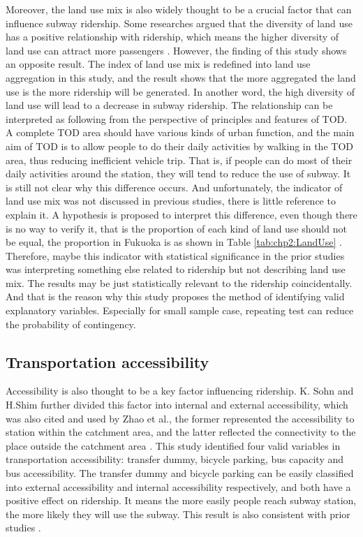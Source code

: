 %
Moreover, the land use mix is also widely thought to be a crucial factor that can influence subway ridership. Some researches argued that the diversity of land use has a positive relationship with ridership, which means the higher diversity of land use can attract more passengers \cite{gutierrez2011transit,jun2015land}. However, the finding of this study shows an opposite result. The index of land use mix is redefined into land use aggregation in this study, and the result shows that the more aggregated the land use is the more ridership will be generated. In another word, the high diversity of land use will lead to a decrease in subway ridership. The relationship can be interpreted as following from the perspective of principles and features of TOD. A complete TOD area should have various kinds of urban function, and the main aim of TOD is to allow people to do their daily activities by walking in the TOD area, thus reducing inefficient vehicle trip. That is, if people can do most of their daily activities around the station, they will tend to reduce the use of subway. It is still not clear why this difference occurs. And unfortunately, the indicator of land use mix was not discussed in previous studies, there is little reference to explain it. A hypothesis is proposed to interpret this difference, even though there is no way to verify it, that is the proportion of each kind of land use should not be equal, the proportion in Fukuoka is as shown in Table \ref{tab:chp2:LandUse} \cite{bhat2007comprehensive}. Therefore, maybe this indicator with statistical significance in the prior studies was interpreting something else related to ridership but not describing land use mix. The results may be just statistically relevant to the ridership coincidentally. And that is the reason why this study proposes the method of identifying valid explanatory variables. Especially for small sample case, repeating test can reduce the probability of contingency.

%
\subsection{Transportation accessibility}
%
Accessibility is also thought to be a key factor influencing ridership. K. Sohn and H.Shim further divided this factor into internal and external accessibility, which was also cited and used by Zhao et al., the former represented the accessibility to station within the catchment area, and the latter reflected the connectivity to the place outside the catchment area \cite{sohn2010factors,zhao2013influences}. This study identified four valid variables in transportation accessibility: transfer dummy, bicycle parking, bus capacity and bus accessibility. The transfer dummy and bicycle parking can be easily classified into external accessibility and internal accessibility respectively, and both have a positive effect on ridership. It means the more easily people reach subway station, the more likely they will use the subway. This result is also consistent with prior studies \cite{gutierrez2011transit,cardozo2012application,kuby2004factors}.


